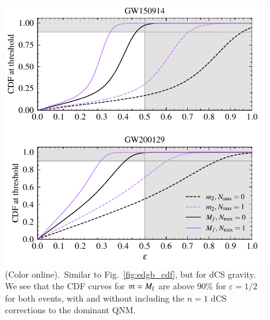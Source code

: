 \documentclass[twocolumn,
               prd,
               aps,
               superscriptaddress,
               tightenlines,
               nofootinbib,
               eqsecnum,
               amsfonts,
               amsmath,
               longbibliography]{revtex4-1}
\newcommand{\gm}{\mathfrak{m}}
\begin{document}
\begin{figure}[t]
\includegraphics[width=\columnwidth]{figs/dcs_cdf_varying_threshold.pdf}
\caption{(Color online).~Similar to Fig.~\ref{fig:edgb_cdf}, but for dCS gravity.
%
We see that the CDF curves for $\gm = M_{\rm f}$ are above 90\% for $\varepsilon =
1/2$ for both events, with and without including the $n = 1$ dCS corrections to
the dominant QNM.
}
\label{fig:dcs_cdf}
\end{figure}
\end{document}
